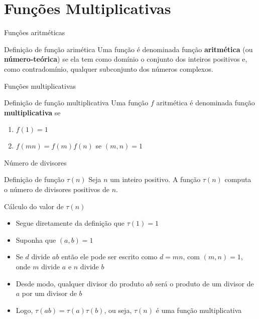 \section{Funções Multiplicativas}

\begin{frame}[fragile]{Funções aritméticas}

    \begin{block}{Definição de função arimética}
        Uma função é denominada função \textbf{aritmética} (ou \textbf{número-teórica}) se ela tem 
        como domínio o conjunto dos inteiros positivos e, como contradomínio, qualquer subconjunto 
        dos números complexos.
    \end{block}
\end{frame}

\begin{frame}[fragile]{Funções multiplicativas}
    \begin{block}{Definição de função multiplicativa}
        Uma função $f$ aritmética é denominada função \textbf{multiplicativa} se

        \begin{enumerate}
            \item $f(1) = 1$
            \item $f(mn) = f(m)f(n)$ se $(m, n) = 1$
        \end{enumerate}
    \end{block}
\end{frame}

\begin{frame}[fragile]{Número de divisores}
    \begin{block}{Definição de função $\tau(n)$}
        Seja $n$ um inteiro positivo. A função $\tau(n)$ computa o número de divisores positivos 
            de $n$.
    \end{block}
\end{frame}

\begin{frame}[fragile]{Cálculo do valor de $\tau(n)$}

    \begin{itemize}
        \item Segue diretamente da definição que $\tau(1) = 1$

        \item Suponha que $(a, b) = 1$
        \item Se $d$ divide $ab$  então ele pode ser escrito como $d = mn$, 
            com $(m, n) = 1$, onde $m$ divide $a$ e $n$ divide $b$

        \item Desde modo, qualquer divisor do produto $ab$ será o produto de um divisor de $a$
            por um divisor de $b$

        \item Logo, $\tau(ab) = \tau(a)\tau(b)$, ou seja, $\tau(n)$ é uma função multiplicativa

    \end{itemize}

\end{frame}

